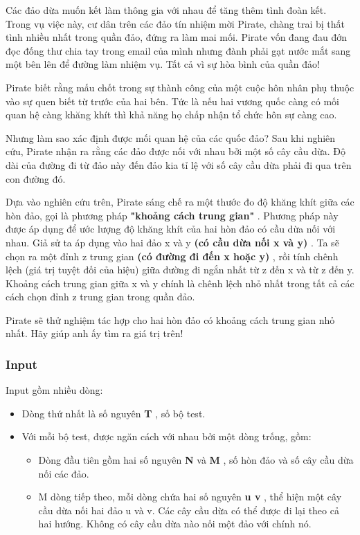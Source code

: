 



   Các đảo dừa muốn kết làm thông gia với nhau để tăng thêm tình đoàn kết. Trong vụ việc này, cư dân trên các đảo tín nhiệm mời Pirate, chàng trai bị thất tình nhiều nhất trong quần đảo, đứng ra làm mai mối. Pirate vốn đang đau đớn đọc đống thư chia tay trong email của mình nhưng đành phải gạt nước mắt sang một bên lên để đường làm nhiệm vụ. Tất cả vì sự hòa bình của quần đảo!  

   Pirate biết rằng mấu chốt trong sự thành công của một cuộc hôn nhân phụ thuộc vào sự quen biết từ trước của hai bên. Tức là nếu hai vương quốc càng có mối quan hệ càng khăng khít thì khả năng họ chấp nhận tổ chức hôn sự càng cao.  

   Nhưng làm sao xác định được mối quan hệ của các quốc đảo? Sau khi nghiên cứu, Pirate nhận ra rằng các đảo được nối với nhau bởi một số cây cầu dừa. Độ dài của đường đi từ đảo này đến đảo kia tỉ lệ với số cây cầu dừa phải đi qua trên con đường đó.  

   Dựa vào nghiên cứu trên, Pirate sáng chế ra một thước đo độ khăng khít giữa các hòn đảo, gọi là phương pháp   \textbf{    "khoảng cách trung gian"   }   . Phương pháp này được áp dụng để ước lượng độ khăng khít của hai hòn đảo có cầu dừa nối với nhau. Giả sử ta áp dụng vào hai đảo x và y   \textbf{    (có cầu dừa nối x và y)   }   . Ta sẽ chọn ra một đỉnh z trung gian   \textbf{    (có đường đi đến x hoặc y)   }   , rồi tính chênh lệch (giá trị tuyệt đối của hiệu) giữa đường đi ngắn nhất từ z đến x và từ z đến y. Khoảng cách trung gian giữa x và y chính là chênh lệch nhỏ nhất trong tất cả các cách chọn đỉnh z trung gian trong quần đảo.  

   Pirate sẽ thử nghiệm tác hợp cho hai hòn đảo có khoảng cách trung gian nhỏ nhất. Hãy giúp anh ấy tìm ra giá trị trên!  

\subsubsection{   Input  }

   Input gồm nhiều dòng:  
\begin{itemize}
	\item     Dòng thứ nhất là số nguyên    \textbf{     T    }    , số bộ test.   
	\item     Với mỗi bộ test, được ngăn cách với nhau bởi một dòng trống, gồm:    
\begin{itemize}
	\item       Dòng đầu tiên gồm hai số nguyên      \textbf{       N      }      và      \textbf{       M      }      , số hòn đảo và số cây cầu dừa nối các đảo.     
	\item       M dòng tiếp theo, mỗi dòng chứa hai số nguyên      \textbf{       u v      }      , thể hiện một cây cầu dừa nối hai đảo u và v. Các cây cầu dừa có thể được đi lại theo cả hai hướng. Không có cây cầu dừa nào nối một đảo với chính nó.     
\end{itemize}
\end{itemize}

